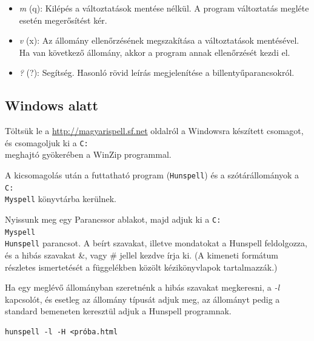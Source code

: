 \begin{itemize}
              Az   Escape   billentyű    kétszeri    lenyomásával
              megszakíthatjuk ezt a műveletet.
	      
Az itt felvett szavak automatikusan a saját
szótárba kerülnek. Ha ezt innen törölni
szeretnénk, a programból kilépve
a saját szótár kézi átszerkesztésével tehetjük meg.

\item  \emph{m} (q):            Kilépés  a  változtatások mentése nélkül. A program
              változtatás megléte esetén megerősítést kér.

\item  \emph{v} (x):            Az   állomány   ellenőrzésének    megszakítása    a
              változtatások    mentésével.   Ha   van   következő
              állomány, akkor a program annak ellenőrzését  kezdi
              el.

\item  \emph{?} (?):            Segítség.  Hasonló  rövid  leírás  megjelenítése  a
              billentyűparancsokról.
\end{itemize}

\subsection{Windows alatt}

Töltsük le a \url{http://magyarispell.sf.net} oldalról a
Windowsra készített csomagot, és csomagoljuk ki
a \texttt{C:\\} meghajtó gyökerében a WinZip programmal.

A kicsomagolás után a futtatható
program (\texttt{Hunspell}) és a szótárállományok a
\texttt{C:\\Myspell} könyvtárba kerülnek.

Nyissunk meg egy Parancssor ablakot, majd adjuk ki a
\texttt{C:\\Myspell\\Hunspell} parancsot. A beírt szavakat,
illetve mondatokat a Hunspell feldolgozza, és a hibás
szavakat \&, vagy \# jellel kezdve írja ki. (A kimeneti
formátum részletes ismertetését a függelékben közölt
kézikönyvlapok tartalmazzák.)

Ha egy meglévő állományban szeretnénk a hibás szavakat
megkeresni, a \emph{-l} kapcsolót, és esetleg az
állomány típusát adjuk meg, az állományt pedig a
standard bemeneten keresztül adjuk a Hunspell programnak.

\begin{verbatim}
hunspell -l -H <próba.html
\end{verbatim}


